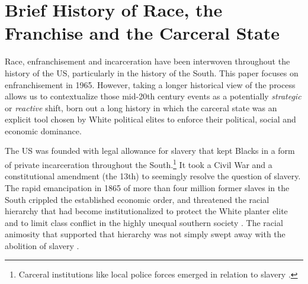 \documentclass[12pt]{article}
\begin{document}
\singlespacing





\section{Brief History of Race, the Franchise and the Carceral State}\label{appendix_history}
\setcounter{table}{0}
\setcounter{figure}{0}
\renewcommand{\thetable}{A\arabic{table}}
\renewcommand{\thefigure}{A\arabic{figure}}
\normalsize


Race, enfranchisement and incarceration have been interwoven throughout the history of the US, particularly in the history of the South.  This paper focuses on enfranchisement in 1965.  However, taking a longer historical view of the process allows us to contextualize those mid-20th century events as a potentially \emph{strategic} or \emph{reactive} shift, born out a long history in which the carceral state was an explicit tool chosen by White political elites to enforce their political, social and economic dominance.

The US was founded with legal allowance for slavery that kept Blacks in a form of private incarceration throughout the South.\footnote{Carceral institutions like local police forces emerged in relation to slavery .}  It took a Civil War and a constitutional amendment (the 13th) to seemingly resolve the question of slavery.  The rapid emancipation in 1865 of more than four million former slaves in the South crippled the established economic order, and threatened the racial hierarchy that had become institutionalized to protect the White planter elite and to limit class conflict in the highly unequal southern society .  The racial animosity that supported that hierarchy was not simply swept away with the abolition of slavery .
\end{document}
